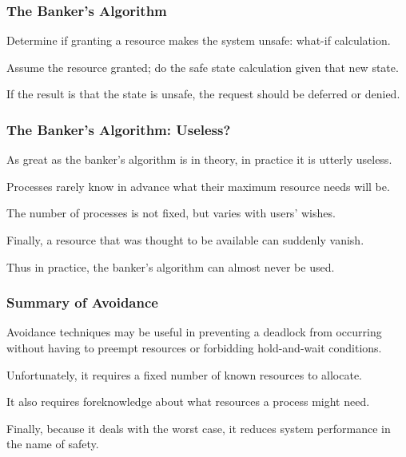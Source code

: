\begin{frame}
	\frametitle{The Banker's Algorithm}

	Determine if granting a resource makes the system unsafe: what-if calculation.

	Assume the resource granted; do the safe state calculation given that new state.

	If the result is that the state is unsafe, the request should be deferred or denied.

\end{frame}

\begin{frame}
	\frametitle{The Banker's Algorithm: Useless?}

	As great as the banker's algorithm is in theory, in practice it is utterly useless.

	Processes rarely know in advance what their maximum resource needs will be.

	The number of processes is not fixed, but varies with users' wishes.

	Finally, a resource that was thought to be available can suddenly vanish.

	Thus in practice, the banker's algorithm can almost never be used.


\end{frame}

\begin{frame}
	\frametitle{Summary of Avoidance}

	Avoidance techniques may be useful in preventing a deadlock from occurring without having to preempt resources or forbidding hold-and-wait conditions.

	Unfortunately, it requires a fixed number of known resources to allocate.

	It also requires foreknowledge about what resources a process might need.

	Finally, because it deals with the worst case, it reduces system performance in the name of safety.

\end{frame}




